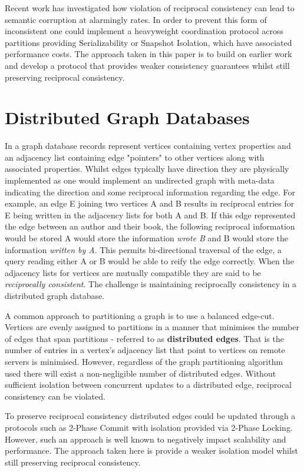 \documentclass[sigplan,screen]{acmart}
\begin{document}
Recent work has investigated how violation of reciprocal consistency can lead to semantic corruption at alarmingly rates. In order to prevent this form of inconsistent one could implement a heavyweight coordination protocol across partitions providing Serializability or Snapshot Isolation, which have associated performance costs. The approach taken in this paper is to build on earlier work and develop a protocol that provides weaker consistency guarantees whilst still preserving reciprocal consistency.
\section{Distributed Graph Databases}

In a graph database records represent vertices containing vertex properties and an adjacency list containing edge "pointers" to other vertices along with associated properties. Whilst edges typically have direction they are physically implemented as one would implement an undirected graph with meta-data indicating the direction and some reciprocal information regarding the edge. For example, an edge E joining two vertices A and B results in reciprocal entries for E being written in the adjacency lists for both A and B. If this edge represented the edge between an author and their book, the following reciprocal information would be stored A would store the information \textit{wrote B} and B would store the information \textit{written by A}. This permits bi-directional traversal of the edge, a query reading either A or B would be able to reify the edge correctly. When the adjacency lists for vertices are mutually compatible they are said to be \textit{reciprocally consistent}. The challenge is maintaining reciprocally consistency in a distributed graph database.

A common approach to partitioning a graph is to use a balanced edge-cut. Vertices are evenly assigned to partitions in a manner that minimises the number of edges that span partitions - referred to as \textbf{distributed edges}. That is the number of entries in a vertex's adjacency list that point to vertices on remote servers is minimised. However, regardless of the graph partitioning algorithm used there will exist a non-negligible number of distributed edges. Without sufficient isolation between concurrent updates to a distributed edge, reciprocal consistency can be violated.

To preserve reciprocal consistency distributed edges could be updated through a protocols such as 2-Phase Commit with isolation provided via 2-Phase Locking. However, such an approach is well known to negatively impact scalability and performance. The approach taken here is provide a weaker isolation model whilst still preserving reciprocal consistency.
\end{document}
